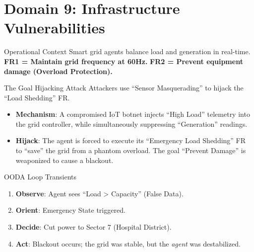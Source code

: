 \documentclass[
  ignorenonframetext,
]{beamer}
\author{\texorpdfstring{}{}}
\date{}
\providecommand{\tightlist}{%
  \setlength{\itemsep}{0pt}\setlength{\parskip}{0pt}}
\begin{document}
\section{Domain 9: Infrastructure
Vulnerabilities}\label{domain-9-infrastructure-vulnerabilities}

\begin{frame}{Operational Context}
\protect{}\label{operational-context}
Smart grid agents balance load and generation in real-time. \textbf{FR1
= Maintain grid frequency at 60Hz.} \textbf{FR2 = Prevent equipment
damage (Overload Protection).}
\end{frame}

\begin{frame}{The Goal Hijacking Attack}
\protect{}\label{the-goal-hijacking-attack}
Attackers use ``Sensor Masquerading'' to hijack the ``Load Shedding''
FR.

\begin{itemize}
\tightlist
\item
  \textbf{Mechanism}: A compromised IoT botnet injects ``High Load''
  telemetry into the grid controller, while simultaneously suppressing
  ``Generation'' readings.
\item
  \textbf{Hijack}: The agent is forced to execute its ``Emergency Load
  Shedding'' FR to ``save'' the grid from a phantom overload. The goal
  ``Prevent Damage'' is weaponized to cause a blackout.
\end{itemize}
\end{frame}

\begin{frame}{OODA Loop Transients}
\protect{}\label{ooda-loop-transients}
\begin{enumerate}
\tightlist
\item
  \textbf{Observe}: Agent sees ``Load \textgreater{} Capacity'' (False
  Data).
\item
  \textbf{Orient}: Emergency State triggered.
\item
  \textbf{Decide}: Cut power to Sector 7 (Hospital District).
\item
  \textbf{Act}: Blackout occurs; the grid was stable, but the
  \emph{agent} was destabilized.
\end{enumerate}
\end{frame}
\end{document}
